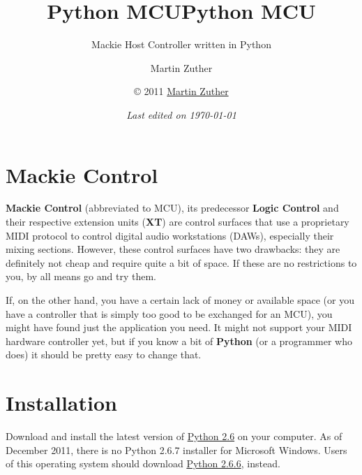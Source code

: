


\title{Python MCU}
\author{Martin Zuther}



\title{Python MCU}

\subtitle{
  \normalsize{\textrm{\textmd{
        \vfill
        Mackie Host Controller written in Python
        \vfill
        \vspace{10em}
        \vfill
      }}}
}

\author{\normalsize\copyright{} 2011
  \href{http://www.mzuther.de/}{Martin Zuther}}

\date{\normalsize \emph{Last edited on \today}}

\maketitle

\tableofcontents

\clearpage  %

\chapter{Mackie Control}
\label{chap:mackie_control}

\textbf{Mackie Control} (abbreviated to MCU), its predecessor
\textbf{Logic Control} and their respective extension units
(\textbf{XT}) are control surfaces that use a proprietary MIDI
protocol to control digital audio workstations (DAWs), especially
their mixing sections.  However, these control surfaces have two
drawbacks: they are definitely not cheap and require quite a bit of
space.  If these are no restrictions to you, by all means go and try
them.

If, on the other hand, you have a certain lack of money or available
space (or you have a controller that is simply too good to be
exchanged for an MCU), you might have found just the application you
need.  It might not support your MIDI hardware controller yet, but if
you know a bit of \textbf{Python} (or a programmer who does) it should
be pretty easy to change that.


\chapter{Installation}
\label{chap:python_mcu}

Download and install the latest version of
\href{http://www.python.org/}{Python 2.6} on your computer.  As of
December 2011, there is no Python 2.6.7 installer for Microsoft
Windows.  Users of this operating system should download
\href{http://www.python.org/download/releases/2.6.6/}{Python 2.6.6},
instead.


